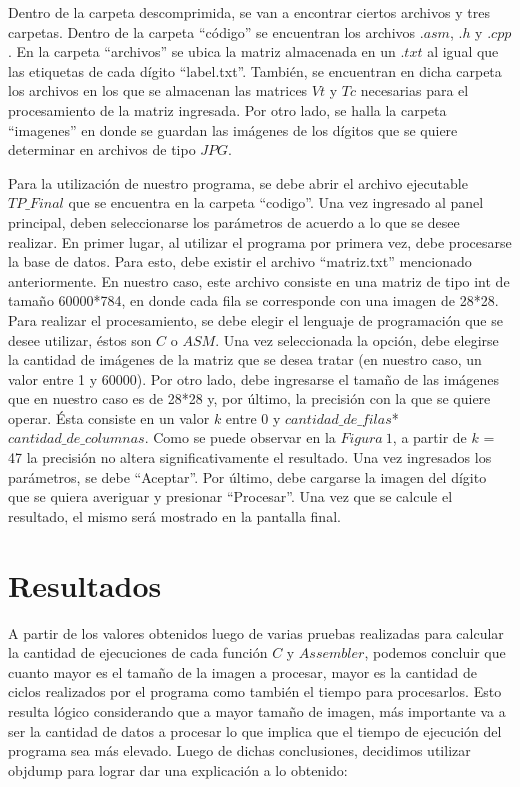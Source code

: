 \documentclass[10pt, a4paper]{article}
\begin{document}
Dentro de la carpeta descomprimida, se van a encontrar ciertos archivos y tres carpetas. Dentro de la carpeta ``código'' se encuentran los archivos $.asm$, $.h$ y $.cpp$. En la carpeta ``archivos'' se ubica la matriz almacenada en un $.txt$ al igual que las etiquetas de cada dígito ``label.txt''. También, se encuentran en dicha carpeta los archivos en los que se almacenan las matrices $Vt$ y $Tc$ necesarias para el procesamiento de la matriz ingresada. Por otro lado, se halla la carpeta ``imagenes'' en donde se guardan las imágenes de los dígitos que se quiere determinar en archivos de tipo $JPG$. 

Para la utilización de nuestro programa, se debe abrir el archivo ejecutable $TP\_Final$ que se encuentra en la carpeta ``codigo''. Una vez ingresado al panel principal, deben seleccionarse los parámetros de acuerdo a lo que se desee realizar. En primer lugar, al utilizar el programa por primera vez, debe procesarse la base de datos. Para esto, debe existir el archivo ``matriz.txt'' mencionado anteriormente. En nuestro caso, este archivo consiste en una matriz de tipo int de tamaño 60000*784, en donde cada fila se corresponde con una imagen de 28*28. Para realizar el procesamiento, se debe elegir el lenguaje de programación que se desee utilizar, éstos son $C$ o $ASM$. Una vez seleccionada la opción, debe elegirse la cantidad de imágenes de la matriz que se desea tratar (en nuestro caso, un valor entre 1 y 60000). Por otro lado, debe ingresarse el tamaño de las imágenes que en nuestro caso es de 28*28 y, por último, la precisión con la que se quiere operar. Ésta consiste en un valor $k$ entre 0 y $cantidad\_de\_filas$*$cantidad\_de\_columnas$. Como se puede observar en la $Figura\ 1$, a partir de $k$ = 47 la precisión no altera significativamente el resultado. Una vez ingresados los parámetros, se debe ``Aceptar''. Por último, debe cargarse la imagen del dígito que se quiera averiguar y presionar ``Procesar''. Una vez que se calcule el resultado, el mismo será mostrado en la pantalla final.  

\section{Resultados}
A partir de los valores obtenidos luego de varias pruebas realizadas para calcular la cantidad de ejecuciones de cada función $C$ y $Assembler$, podemos concluir que cuanto mayor es el tamaño de la imagen a procesar, mayor es la cantidad de ciclos realizados por el programa como también el tiempo para procesarlos. Esto resulta lógico considerando que a mayor tamaño de imagen, más importante va a ser la cantidad de datos a procesar lo que implica que el tiempo de ejecución del programa sea más elevado.\newline
Luego de dichas conclusiones, decidimos utilizar objdump para lograr dar una explicación a lo obtenido:\newline
\end{document}
